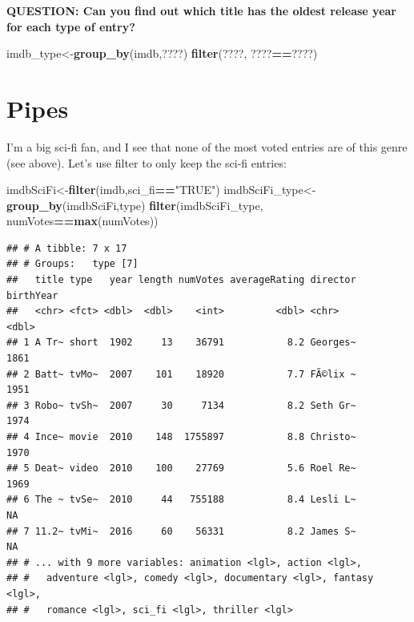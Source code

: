 \documentclass[]{book}
\newenvironment{Shaded}{\begin{snugshade}}{\end{snugshade}}
\newcommand{\KeywordTok}[1]{\textcolor[rgb]{0.13,0.29,0.53}{\textbf{#1}}}
\newcommand{\NormalTok}[1]{#1}
\newcommand{\OperatorTok}[1]{\textcolor[rgb]{0.81,0.36,0.00}{\textbf{#1}}}
\newcommand{\StringTok}[1]{\textcolor[rgb]{0.31,0.60,0.02}{#1}}
\begin{document}
\textbf{QUESTION: Can you find out which title has the oldest release year for each type of entry?}

\begin{Shaded}
\begin{Highlighting}[]
\NormalTok{imdb_type<-}\KeywordTok{group_by}\NormalTok{(imdb,????)}
\KeywordTok{filter}\NormalTok{(????, ????}\OperatorTok{==}\NormalTok{????)}
\end{Highlighting}
\end{Shaded}

\hypertarget{pipes}{%
\section{Pipes}\label{pipes}}

I'm a big sci-fi fan, and I see that none of the most voted entries are of this genre (see above). Let's use filter to only keep the sci-fi entries:

\begin{Shaded}
\begin{Highlighting}[]
\NormalTok{imdbSciFi<-}\KeywordTok{filter}\NormalTok{(imdb,sci_fi}\OperatorTok{==}\StringTok{"TRUE"}\NormalTok{)}
\NormalTok{imdbSciFi_type<-}\KeywordTok{group_by}\NormalTok{(imdbSciFi,type)}
\KeywordTok{filter}\NormalTok{(imdbSciFi_type, numVotes}\OperatorTok{==}\KeywordTok{max}\NormalTok{(numVotes))}
\end{Highlighting}
\end{Shaded}

\begin{verbatim}
## # A tibble: 7 x 17
## # Groups:   type [7]
##   title type   year length numVotes averageRating director birthYear
##   <chr> <fct> <dbl>  <dbl>    <int>         <dbl> <chr>        <dbl>
## 1 A Tr~ short  1902     13    36791           8.2 Georges~      1861
## 2 Batt~ tvMo~  2007    101    18920           7.7 FÃ©lix ~      1951
## 3 Robo~ tvSh~  2007     30     7134           8.2 Seth Gr~      1974
## 4 Ince~ movie  2010    148  1755897           8.8 Christo~      1970
## 5 Deat~ video  2010    100    27769           5.6 Roel Re~      1969
## 6 The ~ tvSe~  2010     44   755188           8.4 Lesli L~        NA
## 7 11.2~ tvMi~  2016     60    56331           8.2 James S~        NA
## # ... with 9 more variables: animation <lgl>, action <lgl>,
## #   adventure <lgl>, comedy <lgl>, documentary <lgl>, fantasy <lgl>,
## #   romance <lgl>, sci_fi <lgl>, thriller <lgl>
\end{verbatim}
\end{document}
